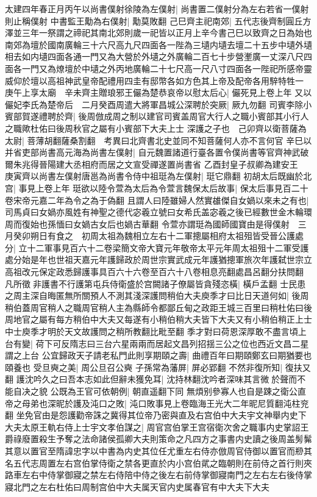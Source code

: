 太建四年春正月丙午以尚書僕射徐陵為左僕射|{
	尚書置二僕射分為左右若省一僕射則止稱僕射}
中書監王勱為右僕射|{
	勱莫敗翻}
己巳齊主祀南郊|{
	五代志後齊制圓丘方澤並三年一祭謂之禘祀其南北郊則歲一祀皆以正月上辛今書己巳以致齊之日為始也南郊為壇於國南廣輪三十六尺高九尺四面各一陛為三壝内壝去壇二十五步中壝外壝相去如内壝四面各通一門又為大營於外壝之外廣輪二百七十步營壍廣一丈深八尺四面各一門又為燎壇於中壝之外丙地廣輪二十七尺高一尺八寸四面各一陛祀所感帝靈威仰於壇以高祖神武皇帝配禮用四圭有邸幣各如方色其上帝及配帝各用騂特牲一}
庚午上享太廟　辛未齊主贈琅邪王儼為楚恭哀帝以慰太后心|{
	儼死見上卷上年}
又以儼妃李氏為楚帝后　二月癸酉周遣大將軍昌城公深聘於突厥|{
	厥九勿翻}
司賓李除小賓部賀遂禮聘於齊|{
	後周倣成周之制以建官司賓盖周官大行人之職小賓部其小行人之職歟杜佑曰後周秋官之屬有小賓部下大夫上士}
深護之子也　己卯齊以衛菩薩為太尉|{
	菩薄胡翻薩桑割翻　考異曰北齊書北史並同不知菩薩何人亦不言何官}
辛巳以并省吏部尚書高元海為尚書左僕射|{
	自元魏置諸道行臺各置令僕尚書等官齊神武破爾朱兆得晉陽建大丞相府而居之文宣受禪遂置尚書省}
乙酉封皇子叔卿為建安王　庚寅齊以尚書左僕射唐邕為尚書令侍中祖珽為左僕射|{
	珽它鼎翻}
初胡太后既幽於北宫|{
	事見上卷上年}
珽欲以陸令萱為太后為令萱言魏保太后故事|{
	保太后事見百二十卷宋帝元嘉二年為令之為于偽翻}
且謂人曰陸雖婦人然實䧺傑自女媧以來未之有也|{
	司馬貞曰女媧亦風姓有神聖之德代宓羲立號曰女希氏盖宓羲之後已經數世金木輪環周而復始也孫愐曰女媧古女后也媧古華翻}
令萱亦謂珽為國師國寶由是得僕射　三月癸卯朔日有食之　初周太祖為魏相立左右十二軍摠屬相府太祖殂皆受晉公護處分|{
	立十二軍事見百六十二卷梁簡文帝大寶元年敬帝太平元年周太祖殂十二軍受護處分始是年也世祖天嘉元年護歸政於周世宗實武成元年護猶摠軍旅次年護弑世宗立高祖改元保定政悉歸護事具百六十六卷至百六十八卷相息亮翻處昌呂翻分扶問翻}
凡所徵非護書不行護第屯兵侍衛盛於宫闕諸子僚屬皆貪殘恣橫|{
	橫戶孟翻}
士民患之周主深自晦匿無所關預人不測其淺深護問稍伯大夫庾季才曰比日天道何如|{
	後周稍伯蓋周官稍人之職周官稍人主為縣師令都鄙丘甸之政距王城三百里曰稍杜佑曰後周地官之屬有每方稍伯中大夫又每遂有小稍伯稍大夫皆下大夫又有小稍伯稍正上士中士庾季才明於天文故護問之稍所教翻比毗至翻}
季才對曰荷恩深厚敢不盡言頃上台有變|{
	荷下可反隋志曰三台六星兩兩而居起文昌列招揺三公之位也西近文昌二星謂之上台}
公宜歸政天子請老私門此則享期頤之壽|{
	曲禮百年曰期頤鄭玄曰期猶要也頤養也}
受旦奭之美|{
	周公旦召公奭}
子孫常為藩屏|{
	屏必郢翻}
不然非復所知|{
	復扶又翻}
護沈吟久之曰吾本志如此但辭未獲免耳|{
	沈持林翻沈吟者深味其言微於聲而不能自决之貌}
公既為王官可依朝例|{
	朝直遥翻下同}
無煩别參寡人也自是踈之衛公直帝之母弟也深昵於護及沌口之敗|{
	沌口敗事見上卷臨海王光大二年昵尼質翻沌柱兖翻}
坐免官由是怨護勸帝誅之冀得其位帝乃密與直及右宫伯中大夫宇文神舉内史下大夫太原王軌右侍上士宇文孝伯謀之|{
	周官宫伯掌王宫宿衛次舍之職事内史掌詔王爵祿廢置殺生予奪之法命諸侯孤卿大夫則策命之凡四方之事書内史讀之後周盖髣髴其意以置官至隋諱忠字以中書為内史其位任尤重左右侍亦倣周官侍御以置官而剙其名五代志周置左右宫伯掌侍衛之禁各更直於内小宫伯貮之臨朝則在前侍之首行則夾路車左右中侍掌御寢之禁左右侍陪中侍之後左右前侍掌御寢南門之左右左右後侍掌寢北門之左右杜佑曰周制宫伯中大夫属天官内史属春官有中大夫下大夫}
